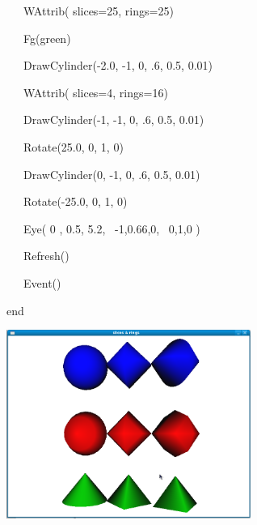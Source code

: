 \documentclass[letterpaper]{article}
\begin{document}
\bigskip

{\sffamily
\ \ \ WAttrib( {\textquotedbl}slices=25{\textquotedbl}, {\textquotedbl}rings=25{\textquotedbl}) \ \ \ \ \ }

{\sffamily
\ \ \ Fg({\textquotedbl}green{\textquotedbl}) \ \ }

{\sffamily
\ \ \ DrawCylinder(-2.0, -1, 0, .6, 0.5, 0.01)}


\bigskip

{\sffamily
\ \ \ WAttrib( {\textquotedbl}slices=4{\textquotedbl}, {\textquotedbl}rings=16{\textquotedbl}) \ \ \ \ \ }

{\sffamily
\ \ \ DrawCylinder(-1, -1, 0, .6, 0.5, 0.01)}


\bigskip

{\sffamily
\ \ \ Rotate(25.0, 0, 1, 0)}

{\sffamily
\ \ \ DrawCylinder(0, -1, 0, .6, 0.5, 0.01)}

{\sffamily
\ \ \ Rotate(-25.0, 0, 1, 0)}

{\sffamily
\ \ \ Eye( 0 , 0.5, 5.2, \ {}-1,0.66,0, \ 0,1,0 )}

{\sffamily
\ \ \ Refresh()}

{\sffamily
\ \ \ Event()}

{\sffamily
end}


\bigskip



\begin{center}
\includegraphics[width=3.148in,height=2.4299in]{utr9/utr9-img022.png}
\end{center}

\bigskip


\bigskip
\end{document}
